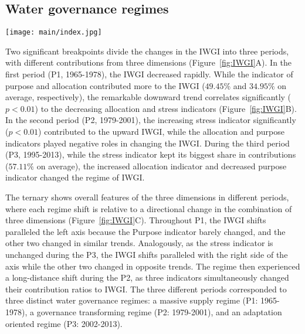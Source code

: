 \subsection{Water governance regimes}
\label{Res.1}

\begin{figure*}[ht!]
	\centering
	\texttt{[image: main/index.jpg]}
	\caption{Changes in the IWGI index and corresponding water governance regimes: P1: 1965-1978, P2: 1979-2001, and P3: 2002-2013.
	\textbf{A,} detecting change points of IWGI and contributions from each indicator. Two significant change points ($p<0.01$) occurred in 1978 and 2001.
	\textbf{B,} correlation of trends between the IWGI and the indicators.
	\textbf{C,} across three indicators, changing components of the IWGI, whose directions shifts between different regimes.
	}
	\label{fig:IWGI}
\end{figure*}

Two significant breakpoints divide the changes in the IWGI into three periods, with different contributions from three dimensions (Figure~\ref{fig:IWGI}A).
In the first period (P1, 1965-1978), the IWGI decreased rapidly.
While the indicator of purpose and allocation contributed more to the IWGI ($49.45\%$ and $34.95\%$ on average, respectively), the remarkable downward trend correlates significantly ($p<0.01$) to the decreasing allocation and stress indicators (Figure~\ref{fig:IWGI}B).
In the second period (P2, 1979-2001), the increasing stress indicator significantly ($p<0.01$) contributed to the upward IWGI, while the allocation and purpose indicators played negative roles in changing the IWGI.
During the third period (P3, 1995-2013), while the stress indicator kept its biggest share in contributions ($57.11\%$ on average), the increased allocation indicator and decreased purpose indicator changed the regime of IWGI.

The ternary shows overall features of the three dimensions in different periods, where each regime shift is relative to a directional change in the combination of three dimensions (Figure~\ref{fig:IWGI}C).
Throughout P1, the IWGI shifts paralleled the left axis because the Purpose indicator barely changed, and the other two changed in similar trends.
Analogously, as the stress indicator is unchanged during the P3, the IWGI shifts paralleled with the right side of the axis while the other two changed in opposite trends.
The regime then experienced a long-distance shift during the P2, as three indicators simultaneously changed their contribution ratios to IWGI.
The three different periods corresponded to three distinct water governance regimes: a massive supply regime (P1: 1965-1978), a governance transforming regime (P2: 1979-2001), and an adaptation oriented regime (P3: 2002-2013).


